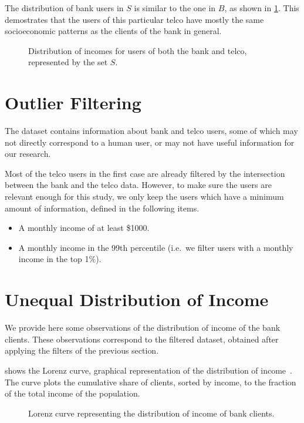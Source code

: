 The distribution of bank users in $S$ is similar to the one in $B$, as shown in \cref{fig:matchdistribution}. This demostrates that the users of this particular telco have mostly the same socioeconomic patterns as the clients of the bank in general.

\begin{figure}
\centering
{}
\caption{Distribution of incomes for users of both the bank and telco, represented by the set $S$.}
\label{fig:matchdistribution}
\end{figure}

\section{Outlier Filtering}
\label{subsec:outlier_filtering}

The dataset contains information about bank and telco users, some of which may not directly correspond to a human user, or may not have useful information for our research.

Most of the telco users in the first case are already filtered by the intersection between the bank and the telco data. However, to make sure the users are relevant enough for this study, we only keep the users which have a minimum amount of information, defined in the following items.

\begin{itemize}
	\item A monthly income of at least \$\num{1000}.
	\item A monthly income in the \num{99}th percentile (i.e.\ we filter users with a monthly income in the top 1\%).
\end{itemize}

\section{Unequal Distribution of Income}

We provide here some observations of the distribution of income of the bank clients. These observations correspond to the filtered dataset, obtained after applying the filters of the previous section.

 shows the Lorenz curve, graphical representation of the distribution of income~\cite{satchell1987}. The curve plots the cumulative share of clients, sorted by income, to the fraction of the total income of the population.

\begin{figure}
\centering
{}
\caption{Lorenz curve representing the distribution of income of bank clients.}
\label{fig:lorenz}
\end{figure}

